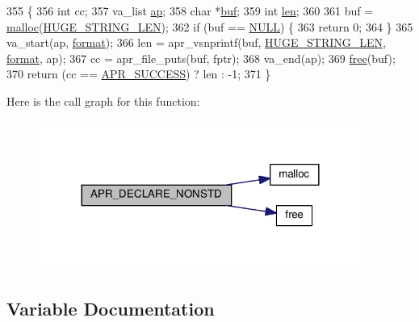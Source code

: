 \begin{DoxyCode}
355 \{
356     \textcolor{keywordtype}{int} cc;
357     va\_list \hyperlink{group__APR__Strings__Snprintf_ga21ecbc810cd93b85a818c96ca2f92f1a}{ap};
358     \textcolor{keywordtype}{char} *\hyperlink{group__APACHE__CORE__PROTO_ga17bc47ccf1b618ed082a4ff4f2cc7f7e}{buf};
359     \textcolor{keywordtype}{int} \hyperlink{group__APACHE__CORE__LOG_gab5a43233d60ef05c5b5bf5cba3d74468}{len};
360 
361     buf = \hyperlink{util__expr__parse_8c_a5faf6a2d99f50a4655dd390199a8db7b}{malloc}(\hyperlink{group__APACHE__CORE__DAEMON_ga0c9dd98f46b90b5bcd4cbf75e252d0da}{HUGE\_STRING\_LEN});
362     \textcolor{keywordflow}{if} (buf == \hyperlink{pcre_8txt_ad7f989d16aa8ca809a36bc392c07fba1}{NULL}) \{
363         \textcolor{keywordflow}{return} 0;
364     \}
365     va\_start(ap, \hyperlink{group__apr__file__io_ga34332e75afdd7ed8d280f2a09b4329ea}{format});
366     len = apr\_vsnprintf(buf, \hyperlink{group__APACHE__CORE__DAEMON_ga0c9dd98f46b90b5bcd4cbf75e252d0da}{HUGE\_STRING\_LEN}, \hyperlink{group__apr__file__io_ga34332e75afdd7ed8d280f2a09b4329ea}{format}, ap);
367     cc = apr\_file\_puts(buf, fptr);
368     va\_end(ap);
369     \hyperlink{util__expr__parse_8c_af07d89f5ceaea0c7c8252cc41fd75f37}{free}(buf);
370     \textcolor{keywordflow}{return} (cc == \hyperlink{group__apr__errno_ga9ee311b7bf1c691dc521d721339ee2a6}{APR\_SUCCESS}) ? len : -1;
371 \}
\end{DoxyCode}


Here is the call graph for this function\+:
\nopagebreak
\begin{figure}[H]
\begin{center}
\leavevmode
\includegraphics[width=300pt]{group__apr__tables_gab02b0393c878208ff6cb55c701ff536a_cgraph}
\end{center}
\end{figure}




\subsection{Variable Documentation}
